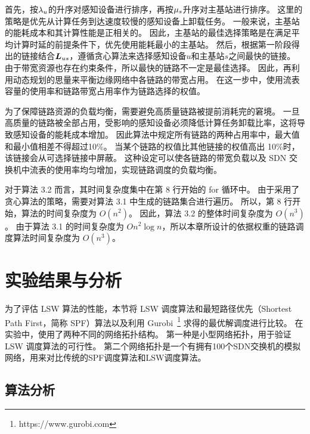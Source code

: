 首先，按${\lambda}_{u}$的升序对感知设备进行排序，再按${\mu}_{s}$升序对主基站进行排序。
这里的策略是优先从计算任务到达速度较慢的感知设备上卸载任务。
一般来说，主基站的能耗成本和其计算性能是正相关的。
因此，主基站的最佳选择策略是在满足平均计算时延的前提条件下，优先使用能耗最小的主基站。
然后，根据第一阶段得出的链接结合$\boldsymbol{L}_{us}$，遵循贪心算法来选择感知设备$u$和主基站$s$之间最快的链接。 
由于带宽资源也存在约束条件，所以最快的链路不一定是最佳选择。
因此，再利用动态规划的思量来平衡边缘网络中各链路的带宽占用。
在这一步中，使用流表容量的使用率和链路带宽占用率作为链路选择的权值。

为了保障链路资源的负载均衡，需要避免高质量链路被提前消耗完的窘境。
一旦高质量的链路被全部占用，受影响的感知设备必须降低计算任务卸载比率，这将导致感知设备的能耗成本增加。
因此算法中规定所有链路的两种占用率中，最大值和最小值相差不得超过10\%。
当某个链路的权值比其他链接的权值高出 10\%时，该链接会从可选择链接中屏蔽。
这种设定可以使各链路的带宽负载以及 SDN 交换机中流表的使用率均匀增加，实现链路调度的负载均衡。

对于算法 3.2 而言，其时间复杂度集中在第 8 行开始的 for 循环中。
由于采用了贪心算法的策略，需要对算法 3.1 中生成的链路集合进行遍历。
所以，第 8 行开始，算法的时间复杂度为 $O(n^2)$。
因此，算法 3.2 的整体时间复杂度为 $O(n^3)$。
由于算法 3.1 的时间复杂度为 $O{n^2\log{n}}$，所以本章所设计的依据权重的链路调度算法时间复杂度为 $O(n^3)$。



\section{实验结果与分析}

为了评估 LSW 算法的性能，本节将 LSW 调度算法和最短路径优先（Shortest Path First，简称 SPF）算法以及利用 Gurobi~\footnote{https://www.gurobi.com} 求得的最优解调度进行比较。
在实验中，使用了两种不同的网络拓扑结构。
第一种是小型网络拓扑，用于验证 LSW 调度算法的可行性。
第二个网络拓扑是一个有拥有100个SDN交换机的模拟网络，用来对比传统的SPF调度算法和LSW调度算法。

\subsection{算法分析}

